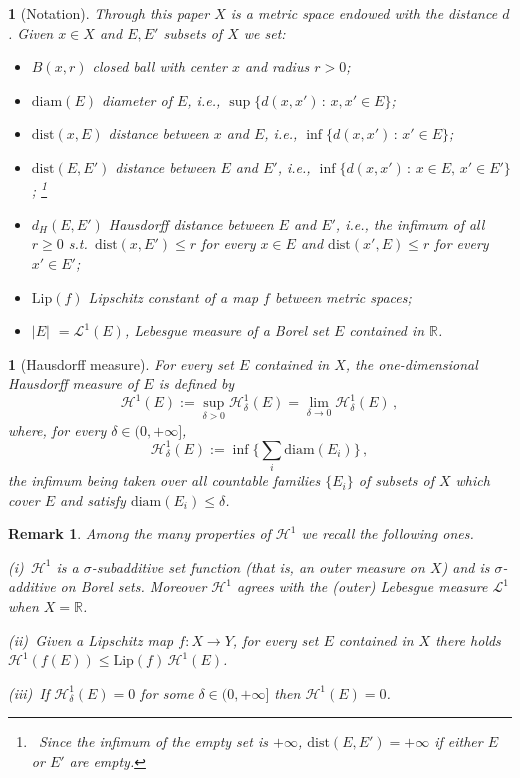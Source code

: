 \documentclass[11pt,reqno,a4paper,final]{amsart}
\numberwithin{equation}{section}
\theoremstyle{mytheorem}
\theoremstyle{myremark}
\newtheorem{remark}[subsection]{Remark}
\theoremstyle{myparagraph}
\newtheorem{parag}[subsection]{}
\newcommand{\footnoteb}[1]{\footnote{~#1}}
\newenvironment{itemizeb}
{\begin{itemize}\itemsep=2pt\leftskip -5 pt}
{\end{itemize}}
\newcommand{\R}{\mathbb{R}}
\newcommand{\Haus}{\mathscr{H}}
\newcommand{\Leb}{\mathscr{L}}
\newcommand{\diam}{\mathrm{diam}}
\newcommand{\dist}{\mathrm{dist}}
\newcommand{\Lip}{\mathrm{Lip}}
\begin{document}
\begin{parag}[Notation]
\label{s-metric}
Through this paper $X$ is a metric space endowed 
with the distance $d$.
Given $x\in X$ and $E, E'$ subsets of $X$ we set:
%
\begin{itemizeb}\leftskip .7 cm=.2 cm
%
\item[$B(x,r)$]
\emph{closed} ball with center $x$ and radius $r>0$;
%
\item[$\diam(E)$]
diameter of $E$, i.e., 
$\sup\{ d(x,x') \, : \, x,x'\in E\}$;
%
\item[$\dist(x,E)$]
distance between $x$ and $E$, i.e.,
$\inf \{ d(x,x') \, : \, x'\in E\}$;
%
\item[$\dist(E,E')$]
distance between $E$ and $E'$, 
i.e., $\inf \{ d(x,x') \, : \, x\in E, \, x'\in E'\}$;%
%
\footnoteb{Since the infimum of the empty set is $+\infty$,
$\dist(E,E')=+\infty$ if either $E$ or $E'$ are empty.\label{footnote3}}

%
%
\item[$d_H(E,E')$]  
Hausdorff distance between $E$ and $E'$, i.e.,
the infimum of all $r \ge 0$ s.t.\ $\dist(x,E')\le r$ for every $x\in E$ 
and $\dist(x',E)\le r$ for every $x'\in E'$;
%
\item[$\Lip(f)$]
Lipschitz constant of a map $f$ between metric spaces;
%
\item[$|E|$]
$=\Leb^1(E)$, Lebesgue measure of a Borel set $E$ contained in $\R$.
%
\end{itemizeb}
\end{parag}


\begin{parag}[Hausdorff measure]
\label{s-haus}
For every set $E$ contained in $X$, the one-dimensional 
Hausdorff measure of $E$ is defined by
\[
\Haus^1(E) 
:= \sup_{\delta>0} \Haus^1_\delta(E) 
=\lim_{\delta\to 0} \Haus^1_\delta(E) 
\, , 
\]
where, for every $\delta \in (0,+\infty]$, 
\[
\Haus^1_\delta(E) 
:= \inf \bigg\{ \sum_i \diam(E_i) \bigg\}
\, , 
\]
the infimum being taken over all countable families 
$\{E_i\}$ of subsets of $X$ which cover $E$ and satisfy
$\diam(E_i)\le\delta$.
\end{parag}

\begin{remark}
\label{s-remhaus}
Among the many properties of $\Haus^1$ we recall the following ones.

\smallskip
(i)~$\Haus^1$ is a $\sigma$-subadditive set function 
(that is, an outer measure on $X$) and is $\sigma$-additive
on Borel sets. Moreover $\Haus^1$ agrees with the 
(outer) Lebesgue measure $\Leb^1$ when $X=\R$.

\smallskip
(ii)~Given a Lipschitz map $f:X\to Y$, 
for every set $E$ contained in $X$ there holds 
$\Haus^1(f(E)) \le \Lip(f) \, \Haus^1(E)$.

\smallskip
(iii)~If $\Haus^1_\delta(E)=0$ for some $\delta\in(0,+\infty]$ then 
$\Haus^1(E)=0$.
\end{remark}
\end{document}
